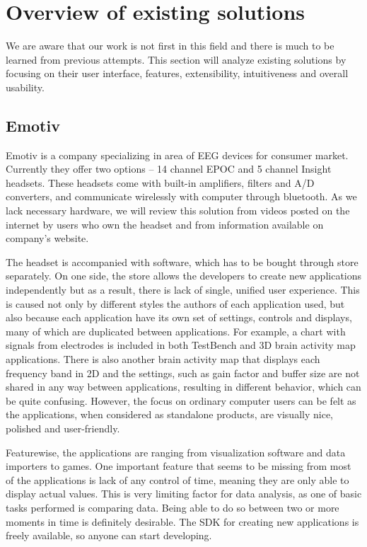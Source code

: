 \section{Overview of existing solutions}
\label{existSol}
We are aware that our work is not first in this field and there is much to be
learned from previous attempts. This section will analyze existing solutions
by focusing on their user interface, features, extensibility, intuitiveness 
and overall usability.

\subsection{Emotiv}
Emotiv is a company specializing in area of EEG devices for consumer market.
Currently they offer two options -- 14 channel EPOC and 5 channel Insight
headsets. These headsets come with built-in amplifiers, filters and A/D
converters, and communicate wirelessly with computer through bluetooth. As
we lack necessary hardware, we will review this solution from videos posted on
the internet by users who own the headset and from information available on
company's website.

The headset is accompanied with software, which has to be bought through store
separately. On one side, the store allows the developers to create new
applications independently but as a result, there is lack of single, unified
user experience. This is caused not only by different styles the authors of each
application used, but also because each application have its own set of
settings, controls and displays, many of which are duplicated between
applications. For example, a chart with signals from electrodes is included in
both TestBench and 3D brain activity map applications. There is also another
brain activity map that displays each frequency band in 2D and the settings,
such as gain factor and buffer size are not shared in any way between
applications, resulting in different behavior, which can be quite confusing.
However, the focus on ordinary computer users can be felt as the applications,
when considered as standalone products, are visually nice, polished and
user-friendly.

Featurewise, the applications are ranging from visualization software and data
importers to games. One important feature that seems to be missing from most of
the applications is lack of any control of time, meaning they are only able to
display actual values. This is very limiting factor for data analysis, as one of
basic tasks performed is comparing data. Being able to do so between two or more
moments in time is definitely desirable. The SDK for creating new applications
is freely available, so anyone can start developing.

